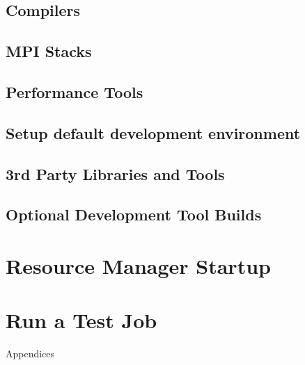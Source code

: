 \documentclass[letterpaper]{article}
\begin{document}
\vspace*{-0.15cm}
\subsection{Compilers} \label{sec:install_compilers}


\subsection{MPI Stacks} \label{sec:mpi}


\subsection{Performance Tools} \label{sec:install_perf_tools}


\subsection{Setup default development environment}


\subsection{3rd Party Libraries and Tools} \label{sec:3rdparty}





\vspace*{.6cm}
\subsection{Optional Development Tool Builds} \label{sec:3rdparty_intel}


\section{Resource Manager Startup} \label{sec:rms_startup}


\section{Run a Test Job} \label{sec:test_job}


\clearpage
\appendix
{\bf \LARGE \centerline{Appendices}} \vspace*{0.2cm}

\renewcommand{\thesubsection}{\Alph{subsection}}







\end{document}
